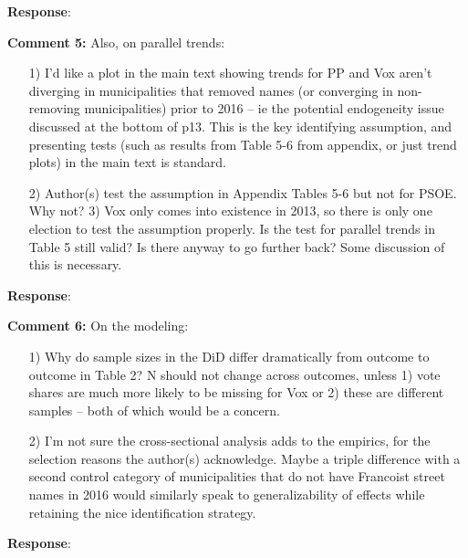 \documentclass[12pt, a4paper, notitlepage]{article}
\begin{document}
\textbf{Response}: {\color{red}{pending}}

\textbf{Comment 5:} Also, on parallel trends:
\begin{itemize}
  \item[1)] I’d like a plot in the main text showing trends for PP and Vox aren’t diverging in municipalities that removed names (or converging in non-removing municipalities) prior to 2016 – ie the potential endogeneity issue discussed at the bottom of p13. This is the key identifying assumption, and presenting tests (such as results from Table 5-6 from appendix, or just trend plots) in the main text is standard.
  \item[2)] Author(s) test the assumption in Appendix Tables 5-6 but not for PSOE. Why not? 3) Vox only comes into existence in 2013, so there is only one election to test the
  assumption properly. Is the test for parallel trends in Table 5 still valid? Is there anyway to go further back? Some discussion of this is necessary.
\end{itemize}

\textbf{Response}: {\color{red}{pending}}

\textbf{Comment 6:} On the modeling:
\begin{itemize}
  \item[1)] Why do sample sizes in the DiD differ dramatically from outcome to outcome in Table 2? N should not change across outcomes, unless 1) vote shares are much more likely to be missing for Vox or 2) these are different samples -- both of which would be a concern.
  \item[2)] I’m not sure the cross-sectional analysis adds to the empirics, for the selection reasons the author(s) acknowledge. Maybe a triple difference with a second control category of municipalities that do not have Francoist street names in 2016 would similarly speak to generalizability of effects while retaining the nice identification strategy.
\end{itemize}

\textbf{Response}: {\color{red}{pending}}
\end{document}
